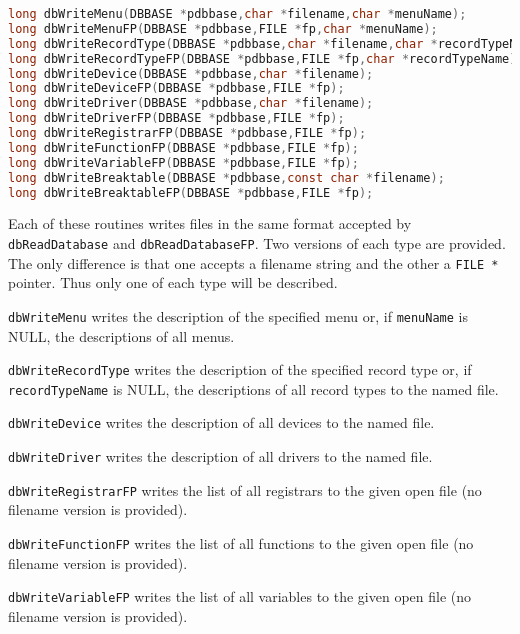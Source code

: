 \begin{lstlisting}[language=C]
long dbWriteMenu(DBBASE *pdbbase,char *filename,char *menuName);
long dbWriteMenuFP(DBBASE *pdbbase,FILE *fp,char *menuName);
long dbWriteRecordType(DBBASE *pdbbase,char *filename,char *recordTypeName);
long dbWriteRecordTypeFP(DBBASE *pdbbase,FILE *fp,char *recordTypeName);
long dbWriteDevice(DBBASE *pdbbase,char *filename);
long dbWriteDeviceFP(DBBASE *pdbbase,FILE *fp);
long dbWriteDriver(DBBASE *pdbbase,char *filename);
long dbWriteDriverFP(DBBASE *pdbbase,FILE *fp);
long dbWriteRegistrarFP(DBBASE *pdbbase,FILE *fp);
long dbWriteFunctionFP(DBBASE *pdbbase,FILE *fp);
long dbWriteVariableFP(DBBASE *pdbbase,FILE *fp);
long dbWriteBreaktable(DBBASE *pdbbase,const char *filename);
long dbWriteBreaktableFP(DBBASE *pdbbase,FILE *fp);
\end{lstlisting}

Each of these routines writes files in the same format accepted by \verb|dbReadDatabase| and \verb|dbReadDatabaseFP|.
Two versions of each type are provided.
The only difference is that one accepts a filename string and the other a \verb|FILE *| pointer.
Thus only one of each type will be described.

\verb|dbWriteMenu| writes the description of the specified menu or, if \verb|menuName| is NULL, the descriptions of all menus.

\verb|dbWriteRecordType| writes the description of the specified record type or, if \verb|recordTypeName| is NULL, the 
descriptions of all record types to the named file.

\verb|dbWriteDevice| writes the description of all devices to the named file.

\verb|dbWriteDriver| writes the description of all drivers to the named file.

\verb|dbWriteRegistrarFP| writes the list of all registrars to the given open file (no filename version is provided).

\verb|dbWriteFunctionFP| writes the list of all functions to the given open file (no filename version is provided).

\verb|dbWriteVariableFP| writes the list of all variables to the given open file (no filename version is provided).

